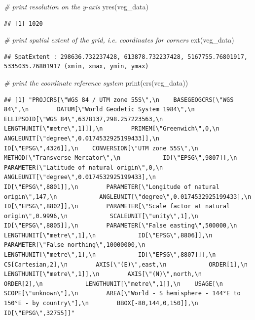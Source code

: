 \documentclass[
  12pt,
]{book}
\newenvironment{Shaded}{\begin{snugshade}}{\end{snugshade}}
\newcommand{\CommentTok}[1]{\textcolor[rgb]{0.56,0.35,0.01}{\textit{#1}}}
\newcommand{\FunctionTok}[1]{\textcolor[rgb]{0.00,0.00,0.00}{#1}}
\newcommand{\NormalTok}[1]{#1}
\begin{document}
\begin{Shaded}
\begin{Highlighting}[]
\CommentTok{\# print resolution on the y{-}axis}
\FunctionTok{yres}\NormalTok{(veg\_data)}
\end{Highlighting}
\end{Shaded}

\begin{verbatim}
## [1] 1020
\end{verbatim}

\begin{Shaded}
\begin{Highlighting}[]
\CommentTok{\# print spatial extent of the grid, i.e. coordinates for corners}
\FunctionTok{ext}\NormalTok{(veg\_data)}
\end{Highlighting}
\end{Shaded}

\begin{verbatim}
## SpatExtent : 298636.732237428, 613878.732237428, 5167755.76801917, 5335035.76801917 (xmin, xmax, ymin, ymax)
\end{verbatim}

\begin{Shaded}
\begin{Highlighting}[]
\CommentTok{\# print the coordinate reference system}
\FunctionTok{print}\NormalTok{(}\FunctionTok{crs}\NormalTok{(veg\_data))}
\end{Highlighting}
\end{Shaded}

\begin{verbatim}
## [1] "PROJCRS[\"WGS 84 / UTM zone 55S\",\n    BASEGEOGCRS[\"WGS 84\",\n        DATUM[\"World Geodetic System 1984\",\n            ELLIPSOID[\"WGS 84\",6378137,298.257223563,\n                LENGTHUNIT[\"metre\",1]]],\n        PRIMEM[\"Greenwich\",0,\n            ANGLEUNIT[\"degree\",0.0174532925199433]],\n        ID[\"EPSG\",4326]],\n    CONVERSION[\"UTM zone 55S\",\n        METHOD[\"Transverse Mercator\",\n            ID[\"EPSG\",9807]],\n        PARAMETER[\"Latitude of natural origin\",0,\n            ANGLEUNIT[\"degree\",0.0174532925199433],\n            ID[\"EPSG\",8801]],\n        PARAMETER[\"Longitude of natural origin\",147,\n            ANGLEUNIT[\"degree\",0.0174532925199433],\n            ID[\"EPSG\",8802]],\n        PARAMETER[\"Scale factor at natural origin\",0.9996,\n            SCALEUNIT[\"unity\",1],\n            ID[\"EPSG\",8805]],\n        PARAMETER[\"False easting\",500000,\n            LENGTHUNIT[\"metre\",1],\n            ID[\"EPSG\",8806]],\n        PARAMETER[\"False northing\",10000000,\n            LENGTHUNIT[\"metre\",1],\n            ID[\"EPSG\",8807]]],\n    CS[Cartesian,2],\n        AXIS[\"(E)\",east,\n            ORDER[1],\n            LENGTHUNIT[\"metre\",1]],\n        AXIS[\"(N)\",north,\n            ORDER[2],\n            LENGTHUNIT[\"metre\",1]],\n    USAGE[\n        SCOPE[\"unknown\"],\n        AREA[\"World - S hemisphere - 144°E to 150°E - by country\"],\n        BBOX[-80,144,0,150]],\n    ID[\"EPSG\",32755]]"
\end{verbatim}
\end{document}
